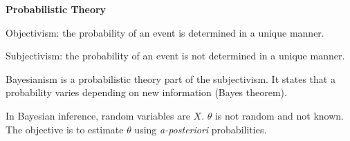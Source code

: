 {\fontsize{12pt}{22pt} \textbf{Probabilistic Theory}\par}

\vspace{5mm}

Objectivism: the probability of an event is determined in a unique manner.

\vspace{5mm}

Subjectivism: the probability of an event is not determined in a unique manner.

Bayesianism is a probabilistic theory part of the subjectivism. It states that a probability varies depending on new information (Bayes theorem).

In Bayesian inference, random variables are $X$. $\theta$ is not random and not known. The objective is to estimate $\theta$ using \textit{a-posteriori} probabilities.

\vspace{5mm}